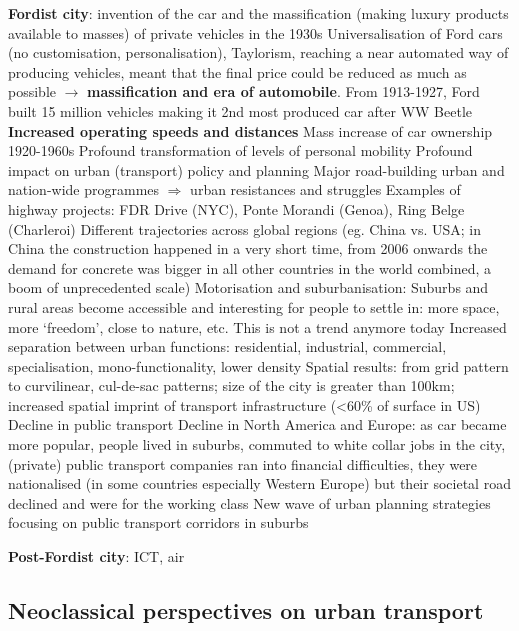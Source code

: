\documentclass{article}
\begin{document}
\begin{outline}
	\1 \textbf{Fordist city}: invention of the car and the massification (making luxury products available to masses) of private vehicles in the 1930s
		\2 Universalisation of Ford cars (no customisation, personalisation), Taylorism, reaching a near automated way of producing vehicles, meant that the final price could be reduced as much as possible $\rightarrow$ \textbf{massification and era of automobile}. From 1913-1927, Ford built 15 million vehicles making it 2nd most produced car after WW Beetle 
		\2 \textbf{Increased operating speeds and distances}
		\2 Mass increase of car ownership 1920-1960s
			\3 Profound transformation of levels of personal mobility
			\3 Profound impact on urban (transport) policy and planning
		\2 Major road-building urban and nation-wide programmes $\Rightarrow$ urban resistances and struggles
			\3 Examples of highway projects: FDR Drive (NYC), Ponte Morandi (Genoa), Ring Belge (Charleroi)
			\3 Different trajectories across global regions (eg. China vs. USA; in China the construction happened in a very short time, from 2006 onwards the demand for concrete was bigger in all other countries in the world combined, a boom of unprecedented scale)
		\2 Motorisation and suburbanisation:
			\3 Suburbs and rural areas become accessible and interesting for people to settle in: more space, more `freedom', close to nature, etc. This is not a trend anymore today
			\3 Increased separation between urban functions: residential, industrial, commercial, specialisation, mono-functionality, lower density
			\3 Spatial results: from grid pattern to curvilinear, cul-de-sac patterns; size of the city is greater than 100km; increased spatial imprint of transport infrastructure (<60\% of surface in US) 
		\2 Decline in public transport
			\3 Decline in North America and Europe: as car became more popular, people lived in suburbs, commuted to white collar jobs in the city, (private) public transport companies ran into financial difficulties, they were nationalised (in some countries especially Western Europe) but their societal road declined and were for the working class
			\3 New wave of urban planning strategies focusing on public transport corridors in suburbs

	\1\textbf{Post-Fordist city}: ICT, air
\end{outline}

\subsection{Neoclassical perspectives on urban transport}
\end{document}
